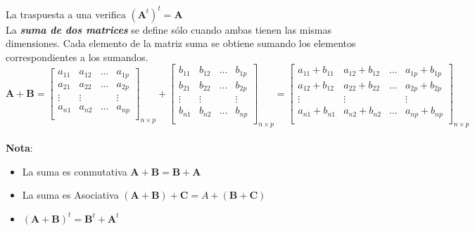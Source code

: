 \documentclass[12pt,letterpaper]{report} %
\begin{document}
La traspuesta a una verifica $(\mathbf{A}^t)^t=\mathbf{A}$ \\

La \textit{\textbf{suma de dos matrices}} se define sólo cuando ambas tienen las mismas dimensiones. Cada elemento de la matriz suma se obtiene sumando los elementos correspondientes a los sumandos.
$$
\mathbf{A}+\mathbf{B}=
\begin{bmatrix}
a_{11} & a_{12} & ... & a_{1p} \\
a_{21} & a_{22} & ... & a_{2p} \\
\vdots & \vdots &     & \vdots \\
a_{n1} & a_{n2} & ... & a_{np} \\
\end{bmatrix}_{n\times p}
+
\begin{bmatrix}
b_{11} & b_{12} & ... & b_{1p} \\
b_{21} & b_{22} & ... & b_{2p} \\
\vdots & \vdots &     & \vdots \\
b_{n1} & b_{n2} & ... & b_{np} \\
\end{bmatrix}_{n\times p}
=
\begin{bmatrix}
a_{11}+b_{11} & a_{12}+b_{12} & ... & a_{1p}+b_{1p} \\
a_{12}+b_{12} & a_{22}+b_{22} & ... & a_{2p}+b_{2p} \\
\vdots & \vdots &     & \vdots \\
a_{n1}+b_{n1} & a_{n2}+b_{n2} & ... & a_{np}+b_{np} \\
\end{bmatrix}_{n\times p}
$$
\\
\textbf{Nota}:
\begin{itemize}
\item La suma es conmutativa $\mathbf{A}+\mathbf{B}=\mathbf{B}+\mathbf{A}$
\item La suma es Asociativa $(\mathbf{A}+\mathbf{B})+\mathbf{C}=A+(\mathbf{B}+\mathbf{C})$
\item $(\mathbf{A}+\mathbf{B})^t=\mathbf{B}^t+\mathbf{A}^t$
\end{itemize}
\end{document}
